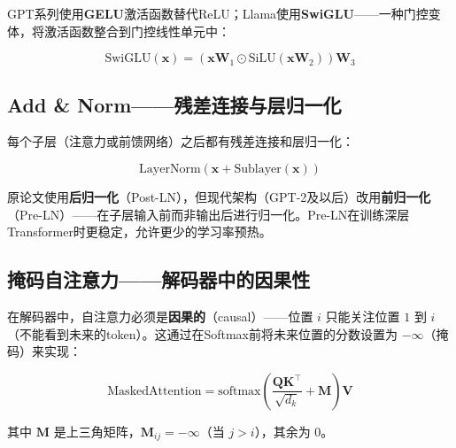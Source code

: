 GPT系列使用\textbf{GELU}激活函数替代ReLU；Llama使用\textbf{SwiGLU}——一种门控变体，将激活函数整合到门控线性单元中：

\[
\text{SwiGLU}(\mathbf{x}) = (\mathbf{x}\mathbf{W}_1 \odot \text{SiLU}(\mathbf{x}\mathbf{W}_2))\mathbf{W}_3
\]

\subsection{Add \& Norm——残差连接与层归一化}

每个子层（注意力或前馈网络）之后都有残差连接和层归一化：

\[
\text{LayerNorm}(\mathbf{x} + \text{Sublayer}(\mathbf{x}))
\]

原论文使用\textbf{后归一化}（Post-LN），但现代架构（GPT-2及以后）改用\textbf{前归一化}（Pre-LN）——在子层输入前而非输出后进行归一化。Pre-LN在训练深层Transformer时更稳定，允许更少的学习率预热。

\subsection{掩码自注意力——解码器中的因果性}

在解码器中，自注意力必须是\textbf{因果的}（causal）——位置 $i$ 只能关注位置 $1$ 到 $i$（不能看到未来的token）。这通过在Softmax前将未来位置的分数设置为 $-\infty$（掩码）来实现：

\[
\text{MaskedAttention} = \text{softmax}\!\left(\frac{\mathbf{Q}\mathbf{K}^{\top}}{\sqrt{d_k}} + \mathbf{M}\right)\mathbf{V}
\]

其中 $\mathbf{M}$ 是上三角矩阵，$\mathbf{M}_{ij} = -\infty$（当 $j > i$），其余为 $0$。

